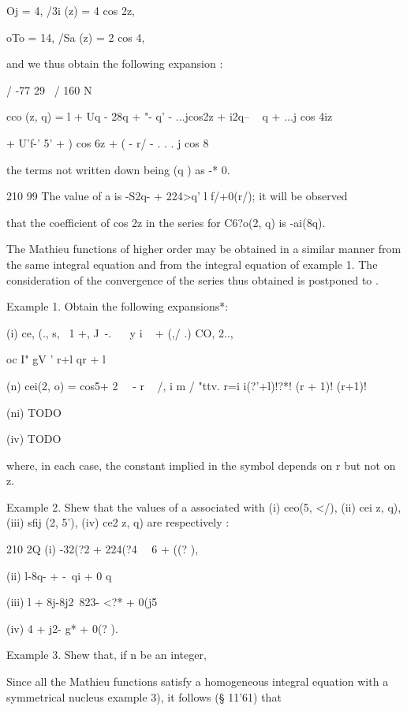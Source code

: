 Oj = 4, /3i (z) = 4 cos 2z,

oTo = 14, /Sa (z) = 2 cos 4,

and we thus obtain the following expansion :

/ -77 29 \ / 160 N

cco (z, q) = l + Uq - 28q + "- q' - ...jcos2z + i2q-- ~ q + ...j cos
4iz

+ U'f-' 5' +  ) cos 6z + ( - r/ - . . . j cos 8

the terms not written down being (q ) as -* 0.

210 99 The value of a is -S2q- + 224>q' l f/+0(r/); it will be
observed

that the coefficient of cos 2z in the series for C6?o(2, q) is
-ai(8q).

%
%

The Mathieu functions of higher order may be obtained in a similar
manner from the same integral equation and from the integral equation
of  example 1. The consideration of the convergence of the
series thus obtained is postponed to .

Example 1. Obtain the following expansions*:

(i) ce, (., s, \ 1 +, J\ -. ~ \ y i ~ + (,/  .) CO, 2..,

oc I" gV ' r+l qr + l

(n) cei(2, o) = cos5+ 2 \ \ - r ~ /, i m / "ttv. r=i i(?'+l)!?*! (r +
1)! (r+1)!

(ni) TODO

(iv) TODO

where, in each case, the constant implied in the symbol depends on r
but not on z.


Example 2. Shew that the values of a associated with (i) ceo(5, </),
(ii) cei z, q), (iii) sfij (2, 5'), (iv) ce2 z, q) are respectively :

210 2Q (i) -32(?2 + 224(?4 \ \, 6 + ((? ),

(ii) l-8q- + -\ qi + 0 q%

(iii) l + 8j-8j2\ 823- <?* + 0(j5

(iv) 4 + j2- g* + 0(? ). 

Example 3. Shew that, if n be an integer,


Since all the Mathieu functions satisfy a homogeneous integral
equation with a symmetrical nucleus  example 3), it follows (§
11'61) that

